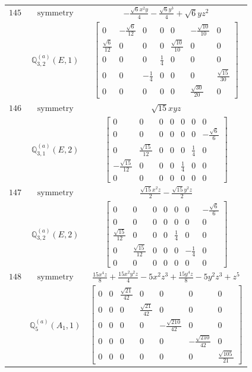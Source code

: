 \documentclass[fleqn,8pt,landscape]{jsarticle}
\begin{document}
\begin{longtable}{ccc}
$ 145 $ & $ \text{symmetry} $ & $ - \frac{\sqrt{6} x^{2} y}{4} - \frac{\sqrt{6} y^{3}}{4} + \sqrt{6} y z^{2} $ \\
$  $ & $ \mathbb{Q}_{3,2}^{(a)}(E,1) $ & $ \begin{bmatrix} 0 & - \frac{\sqrt{6}}{12} & 0 & 0 & 0 & - \frac{\sqrt{10}}{10} & 0 \\ \frac{\sqrt{6}}{12} & 0 & 0 & 0 & \frac{\sqrt{10}}{10} & 0 & 0 \\ 0 & 0 & 0 & \frac{1}{4} & 0 & 0 & 0 \\ 0 & 0 & - \frac{1}{4} & 0 & 0 & 0 & \frac{\sqrt{15}}{30} \\ 0 & 0 & 0 & 0 & 0 & \frac{\sqrt{30}}{20} & 0 \end{bmatrix} $ \\ \hline
$ 146 $ & $ \text{symmetry} $ & $ \sqrt{15} x y z $ \\
$  $ & $ \mathbb{Q}_{3,1}^{(a)}(E,2) $ & $ \begin{bmatrix} 0 & 0 & 0 & 0 & 0 & 0 & 0 \\ 0 & 0 & 0 & 0 & 0 & 0 & - \frac{\sqrt{6}}{6} \\ 0 & \frac{\sqrt{15}}{12} & 0 & 0 & 0 & \frac{1}{4} & 0 \\ - \frac{\sqrt{15}}{12} & 0 & 0 & 0 & \frac{1}{4} & 0 & 0 \\ 0 & 0 & 0 & 0 & 0 & 0 & 0 \end{bmatrix} $ \\ \hline
$ 147 $ & $ \text{symmetry} $ & $ \frac{\sqrt{15} x^{2} z}{2} - \frac{\sqrt{15} y^{2} z}{2} $ \\
$  $ & $ \mathbb{Q}_{3,2}^{(a)}(E,2) $ & $ \begin{bmatrix} 0 & 0 & 0 & 0 & 0 & 0 & - \frac{\sqrt{6}}{6} \\ 0 & 0 & 0 & 0 & 0 & 0 & 0 \\ \frac{\sqrt{15}}{12} & 0 & 0 & 0 & \frac{1}{4} & 0 & 0 \\ 0 & \frac{\sqrt{15}}{12} & 0 & 0 & 0 & - \frac{1}{4} & 0 \\ 0 & 0 & 0 & 0 & 0 & 0 & 0 \end{bmatrix} $ \\ \hline
$ 148 $ & $ \text{symmetry} $ & $ \frac{15 x^{4} z}{8} + \frac{15 x^{2} y^{2} z}{4} - 5 x^{2} z^{3} + \frac{15 y^{4} z}{8} - 5 y^{2} z^{3} + z^{5} $ \\
$  $ & $ \mathbb{Q}_{5}^{(a)}(A_{1},1) $ & $ \begin{bmatrix} 0 & 0 & \frac{\sqrt{21}}{42} & 0 & 0 & 0 & 0 \\ 0 & 0 & 0 & \frac{\sqrt{21}}{42} & 0 & 0 & 0 \\ 0 & 0 & 0 & 0 & - \frac{\sqrt{210}}{42} & 0 & 0 \\ 0 & 0 & 0 & 0 & 0 & - \frac{\sqrt{210}}{42} & 0 \\ 0 & 0 & 0 & 0 & 0 & 0 & \frac{\sqrt{105}}{21} \end{bmatrix} $ \\ \hline

\end{longtable}
\end{document}
